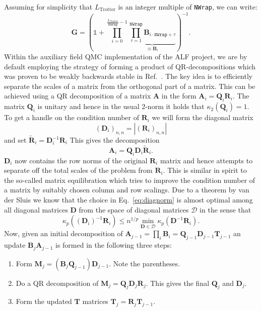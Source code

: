 \documentclass{SciPost}
\begin{document}
Assuming for simplicity that $L_{\text{Trotter}}$ is an integer multiple of \texttt{NWrap}, we can write:
\begin{equation}\label{eqn:green_stable}
\bm{G} = \left( \mathds{1} + \prod\limits_{ i = 0}^{\frac{L_{\text{Trotter}}} {\texttt{NWrap}}-1}       \underbrace{\prod_{\tau=1}^{\texttt{NWrap}} \bm{B}_{i  \cdot  \texttt{NWrap}+ \tau} }_{ \equiv \mathcal{\bm{B}}_i}\right)^{-1}.
\end{equation}
Within the auxiliary field QMC implementation of the ALF project, we are by default employing
the strategy of forming a product of QR-decompositions which was proven to be weakly backwards stable in Ref.~\cite{Bai2011}.
The key idea is to efficiently separate the scales of a matrix from the orthogonal part of a matrix.
This can be achieved using a QR decomposition of a matrix $\bm{A}$ in the form $\bm{A}_i = \bm{Q}_i \bm{R}_i$. The matrix $\bm{Q}_i$ is unitary and hence in the usual $2$-norm it holds that $\kappa_2(\bm{Q}_i) = 1$.
To get a handle on the condition number of $\bm{R}_i$ we will form the
diagonal matrix
\begin{equation}
(\bm{D}_i)_{n,n} = |(\bm{R}_i)_{n,n}|
\label{eq:diagnorm}
\end{equation}
and set $\tilde{\bm{R}}_i = \bm{D}_i^{-1} \bm{R}_i$
This gives the decomposition
\begin{equation}
\bm{A}_i = \bm{Q}_i \bm{D}_i \tilde{\bm{R}}_i.
\end{equation}
$\bm{D}_i$ now contains the row norms of the original $\bm{R}_i$ matrix and hence attempts to separate off the total scales of the problem from $\bm{R}_i$.
This is similar in spirit to the so-called matrix equilibration which tries to improve the condition number of a matrix by suitably chosen column and row scalings.
Due to a theorem by van der Sluis \cite{vanderSluis1969} we know that the choice in Eq.~\eqref{eq:diagnorm} is almost optimal among all diagonal matrices $\bm{D}$ from the space of diagonal matrices 
$\mathcal{D}$ in the sense that
\begin{equation*}
\kappa_p((\bm{D}_i)^{-1} \bm{R}_i ) \leq n^{1/p} \min_{\bm{D} \in \mathcal{D}} \kappa_p(\bm{D}^{-1} \bm{R}_i).
\end{equation*}
Now, given an initial decomposition of $\bm{A}_{j-1} = \prod_i \mathcal{\bm{B}}_i = \bm{Q}_{j-1} \bm{D}_{j-1} \bm{T}_{j-1}$ an update
$\mathcal{\bm{B}}_j \bm{A}_{j-1}$ is formed in the following three steps:
\begin{enumerate}
\item Form $ \bm{M}_j = (\mathcal{\bm{B}}_j \bm{Q}_{j-1}) \bm{D}_{j-1}$. Note the parentheses.
\item Do a QR decomposition of $\bm{M}_j = \bm{Q}_j \bm{D}_j \bm{R}_j$. This gives the final $\bm{Q}_j$ and $\bm{D}_j$.
\item Form the updated $\bm{T}$ matrices $\bm{T}_j = \bm{R}_j \bm{T}_{j-1}$.
\end{enumerate}
\end{document}
